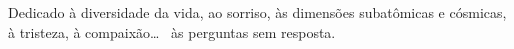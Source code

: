 Dedicado à diversidade da vida, ao sorriso, às dimensões subatômicas e cósmicas, à tristeza, à compaixão\ldots~ às perguntas sem resposta.

